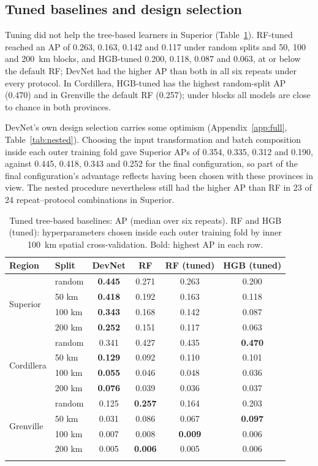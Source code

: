 \documentclass[pdflatex,sn-apa]{sn-jnl}
\begin{document}
\subsection{Tuned baselines and design selection}\label{sec:res-controls}

Tuning did not help the tree-based learners in Superior (Table~\ref{tab:controls}). RF-tuned reached an AP of 0.263, 0.163, 0.142 and 0.117 under random splits and 50, 100 and 200~km blocks, and HGB-tuned 0.200, 0.118, 0.087 and 0.063, at or below the default RF; DevNet had the higher AP than both in all six repeats under every protocol. In Cordillera, HGB-tuned has the highest random-split AP (0.470) and in Grenville the default RF (0.257); under blocks all models are close to chance in both provinces.

DevNet's own design selection carries some optimism (Appendix~\ref{app:full}, Table~\ref{tab:nested}). Choosing the input transformation and batch composition inside each outer training fold gave Superior APs of 0.354, 0.335, 0.312 and 0.190, against 0.445, 0.418, 0.343 and 0.252 for the final configuration, so part of the final configuration's advantage reflects having been chosen with these provinces in view. The nested procedure nevertheless still had the higher AP than RF in 23 of 24 repeat--protocol combinations in Superior.

\begin{table}[t]
\caption{Tuned tree-based baselines: AP (median over six repeats). RF and HGB (tuned): hyperparameters chosen inside each outer training fold by inner 100~km spatial cross-validation. Bold: highest AP in each row.}\label{tab:controls}
\footnotesize
\setlength{\tabcolsep}{3pt}
\begin{tabular*}{\textwidth}{@{\extracolsep\fill}llcccc}
\toprule
Region & Split & DevNet & RF & RF (tuned) & HGB (tuned) \\
\midrule
\multirow{4}{*}{Superior} & random & \textbf{0.445} & 0.271 & 0.263 & 0.200 \\
 & 50 km & \textbf{0.418} & 0.192 & 0.163 & 0.118 \\
 & 100 km & \textbf{0.343} & 0.168 & 0.142 & 0.087 \\
 & 200 km & \textbf{0.252} & 0.151 & 0.117 & 0.063 \\
\midrule
\multirow{4}{*}{Cordillera} & random & 0.341 & 0.427 & 0.435 & \textbf{0.470} \\
 & 50 km & \textbf{0.129} & 0.092 & 0.110 & 0.101 \\
 & 100 km & \textbf{0.055} & 0.046 & 0.048 & 0.036 \\
 & 200 km & \textbf{0.076} & 0.039 & 0.036 & 0.037 \\
\midrule
\multirow{4}{*}{Grenville} & random & 0.125 & \textbf{0.257} & 0.164 & 0.203 \\
 & 50 km & 0.031 & 0.086 & 0.067 & \textbf{0.097} \\
 & 100 km & 0.007 & 0.008 & \textbf{0.009} & 0.006 \\
 & 200 km & 0.005 & \textbf{0.006} & 0.005 & 0.006 \\
\botrule
\end{tabular*}
\end{table}
\end{document}
